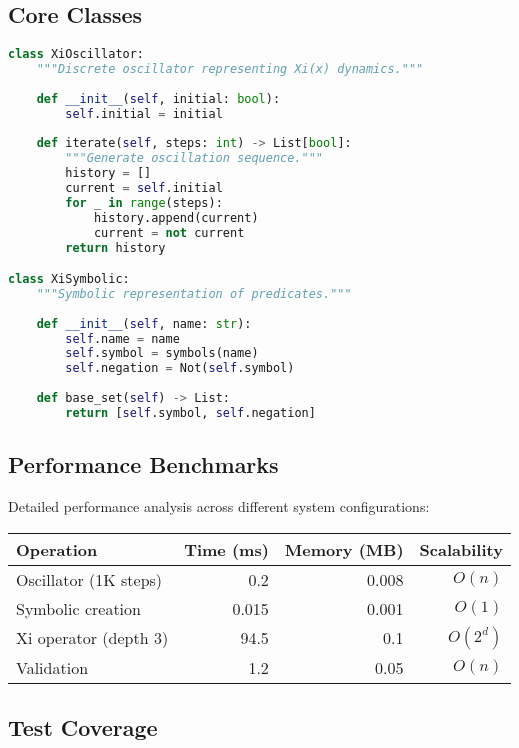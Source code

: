 \documentclass[11pt,a4paper]{article}
\begin{document}
\subsection{Core Classes}

\begin{lstlisting}[language=Python, caption=Core RSO Implementation]
class XiOscillator:
    """Discrete oscillator representing Xi(x) dynamics."""
    
    def __init__(self, initial: bool):
        self.initial = initial
    
    def iterate(self, steps: int) -> List[bool]:
        """Generate oscillation sequence."""
        history = []
        current = self.initial
        for _ in range(steps):
            history.append(current)
            current = not current
        return history

class XiSymbolic:
    """Symbolic representation of predicates."""
    
    def __init__(self, name: str):
        self.name = name
        self.symbol = symbols(name)
        self.negation = Not(self.symbol)
    
    def base_set(self) -> List:
        return [self.symbol, self.negation]
\end{lstlisting}

\subsection{Performance Benchmarks}

Detailed performance analysis across different system configurations:

\begin{center}
\begin{tabular}{lrrr}
\toprule
\textbf{Operation} & \textbf{Time (ms)} & \textbf{Memory (MB)} & \textbf{Scalability} \\
\midrule
Oscillator (1K steps) & 0.2 & 0.008 & $O(n)$ \\
Symbolic creation & 0.015 & 0.001 & $O(1)$ \\
Xi operator (depth 3) & 94.5 & 0.1 & $O(2^d)$ \\
Validation & 1.2 & 0.05 & $O(n)$ \\
\bottomrule
\end{tabular}
\end{center}

\subsection{Test Coverage}
\end{document}
